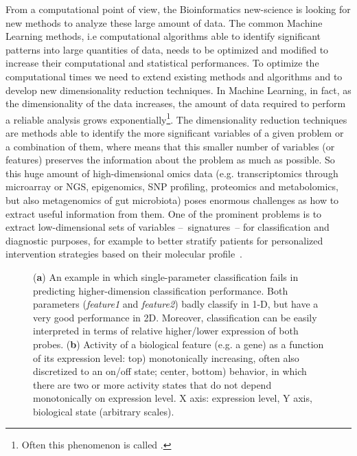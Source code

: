 \documentclass{standalone}
\begin{document}
From a computational point of view, the Bioinformatics new-science is looking for new methods to analyze these large amount of data.
The common Machine Learning methods, i.e computational algorithms able to identify significant patterns into large quantities of data, needs to be optimized and modified to increase their computational and statistical performances.
To optimize the computational times we need to extend existing methods and algorithms and to develop new dimensionality reduction techniques.
In Machine Learning, in fact, as the dimensionality of the data increases, the amount of data required to perform a reliable analysis grows exponentially\footnote{
  Often this phenomenon is called .
}.
The dimensionality reduction techniques are methods able to identify the more significant variables of a given problem or a combination of them, where  means that this smaller number of variables (or features) preserves the information about the problem as much as possible.
So this huge amount of high-dimensional omics data (e.g. transcriptomics through microarray or NGS, epigenomics, SNP profiling, proteomics and metabolomics, but also metagenomics of gut microbiota) poses enormous challenges as how to extract useful information from them.
One of the prominent problems is to extract low-dimensional sets of variables –~signatures~– for classification and diagnostic purposes, for example to better stratify patients for personalized intervention strategies based on their molecular profile~\cite{Scotlandi2009, Chan2011, Johnson2017, Beckmann2016ReconcilingEM}.


\begin{figure}[htbp]
\centering
\def\svgwidth{0.4\textwidth}

\qquad\qquad
\def\svgwidth{0.4\textwidth}

\caption{(\textbf{a}) An example in which single-parameter classification fails in predicting higher-dimension classification performance.
Both parameters (\emph{feature1} and \emph{feature2}) badly classify in 1-D, but have a very good performance in 2D.
Moreover, classification can be easily interpreted in terms of relative higher/lower expression of both probes.
(\textbf{b}) Activity of a biological feature (e.g. a gene) as a function of its expression level:
top) monotonically increasing, often also discretized to an on/off state;
center, bottom)  behavior, in which there are two or more activity states that do not depend monotonically on expression level.
X axis: expression level, Y axis, biological state (arbitrary scales).
}
\label{fig:example}
\end{figure}
\end{document}
